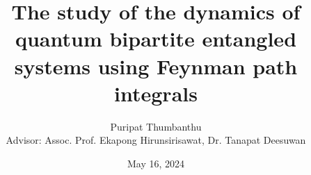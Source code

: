 \documentclass[a4paper, 11pt, openleft]{memoir}
\begin{document}
\title{The study of the dynamics of quantum bipartite entangled systems using Feynman path integrals}
\author{Puripat Thumbanthu \\ Advisor: Assoc. Prof. Ekapong Hirunsirisawat, Dr. Tanapat Deesuwan}
\date{May 16, 2024}

\maketitle

\tableofcontents*




\end{document}
